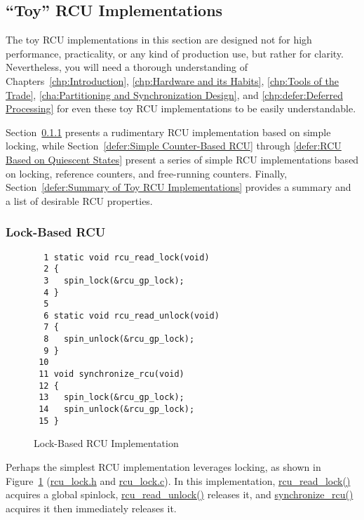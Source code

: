 
\subsection{``Toy'' RCU Implementations}
\label{defer:``Toy'' RCU Implementations}

The toy RCU implementations in this section are designed not for
high performance, practicality, or any kind of production use,
but rather for clarity.
Nevertheless, you will need a thorough understanding of
Chapters~\ref{chp:Introduction},
\ref{chp:Hardware and its Habits},
\ref{chp:Tools of the Trade},
\ref{cha:Partitioning and Synchronization Design},
and
\ref{chp:defer:Deferred Processing}
for even these toy RCU implementations to be easily understandable.

Section~\ref{defer:Lock-Based RCU} presents a rudimentary
RCU implementation based on simple locking, while
Section~\ref{defer:Simple Counter-Based RCU} through
\ref{defer:RCU Based on Quiescent States}
present a series of
simple RCU implementations based on locking, reference counters,
and free-running counters.
Finally, Section~\ref{defer:Summary of Toy RCU Implementations}
provides a summary and a list of desirable RCU properties.

\subsubsection{Lock-Based RCU}
\label{defer:Lock-Based RCU}

\begin{figure}[bp]
{ \scriptsize
\begin{verbatim}
  1 static void rcu_read_lock(void)
  2 {
  3   spin_lock(&rcu_gp_lock);
  4 }
  5
  6 static void rcu_read_unlock(void)
  7 {
  8   spin_unlock(&rcu_gp_lock);
  9 }
 10
 11 void synchronize_rcu(void)
 12 {
 13   spin_lock(&rcu_gp_lock);
 14   spin_unlock(&rcu_gp_lock);
 15 }
\end{verbatim}
}
\caption{Lock-Based RCU Implementation}
\label{fig:defer:Lock-Based RCU Implementation}
\end{figure}

Perhaps the simplest RCU implementation leverages locking, as
shown in
Figure~\ref{fig:defer:Lock-Based RCU Implementation}
(\url{rcu_lock.h} and \url{rcu_lock.c}).
In this implementation, \url{rcu_read_lock()} acquires a global
spinlock, \url{rcu_read_unlock()} releases it, and
\url{synchronize_rcu()} acquires it then immediately releases it.

